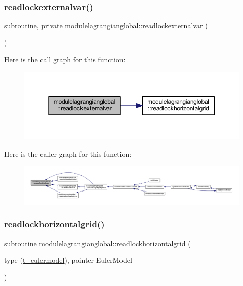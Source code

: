 \subsubsection{\texorpdfstring{readlockexternalvar()}{readlockexternalvar()}}
{\footnotesize\ttfamily subroutine, private modulelagrangianglobal\+::readlockexternalvar (\begin{DoxyParamCaption}{ }\end{DoxyParamCaption})\hspace{0.3cm}{\ttfamily [private]}}

Here is the call graph for this function\+:\nopagebreak
\begin{figure}[H]
\begin{center}
\leavevmode
\includegraphics[width=350pt]{namespacemodulelagrangianglobal_a4051f81e28e0e18dc8950a11d2a7ae65_cgraph}
\end{center}
\end{figure}
Here is the caller graph for this function\+:\nopagebreak
\begin{figure}[H]
\begin{center}
\leavevmode
\includegraphics[width=350pt]{namespacemodulelagrangianglobal_a4051f81e28e0e18dc8950a11d2a7ae65_icgraph}
\end{center}
\end{figure}
\mbox{\label{namespacemodulelagrangianglobal_adc70a932c70ec9be9f9ebdfe0fe60e08}} 
\subsubsection{\texorpdfstring{readlockhorizontalgrid()}{readlockhorizontalgrid()}}
{\footnotesize\ttfamily subroutine modulelagrangianglobal\+::readlockhorizontalgrid (\begin{DoxyParamCaption}\item[{type (\mbox{\hyperlink{structmodulelagrangianglobal_1_1t__eulermodel}{t\+\_\+eulermodel}}), pointer}]{Euler\+Model }\end{DoxyParamCaption})\hspace{0.3cm}{\ttfamily [private]}}

